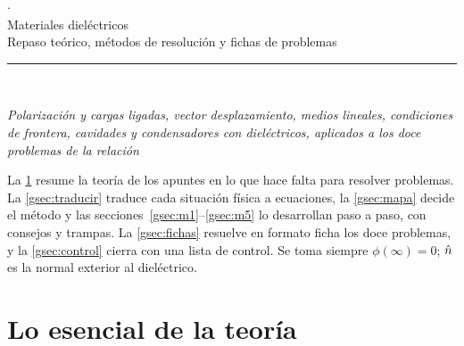 \thispagestyle{plain}
\newcommand{\ficha}[3]{\par\addvspace{1.1em}\noindent{\color{acentoA}\bfseries Problema #1.\ #2}\hfill
  {\small\sffamily\color{acentoC}#3}\par\nopagebreak\smallskip}

\begin{center}
  {\small\color{tenue}\quad$\cdot$\quad{}}\\[1.0em]
  {\fuentetitulo\fontsize{22}{26}\selectfont Materiales dieléctricos}\\[0.5em]
  {\large Repaso teórico, métodos de resolución y fichas de problemas}\\[0.8em]
  {\color{acentoA}\rule{2.6cm}{0.6pt}}\\[0.8em]
  \begin{minipage}{0.86\textwidth}\centering\small\itshape
  Polarización y cargas ligadas, vector desplazamiento, medios lineales, condiciones de frontera,
  cavidades y condensadores con dieléctricos, aplicados a los doce problemas de la relación
  \end{minipage}
\end{center}

\begin{consejo}
La \cref{gsec:teoria} resume la teoría de los apuntes en lo que hace falta para resolver problemas. La
\cref{gsec:traducir} traduce cada situación física a ecuaciones, la \cref{gsec:mapa} decide el método y las
secciones~\ref{gsec:m1}--\ref{gsec:m5} lo desarrollan paso a paso, con consejos y trampas. La
\cref{gsec:fichas} resuelve en formato ficha los doce problemas, y la \cref{gsec:control} cierra con una
lista de control. Se toma siempre $\phi(\infty)=0$; $\hat n$ es la normal exterior al dieléctrico.
\end{consejo}

{\small\tableofcontents}
\newpage

\section{Lo esencial de la teoría}\label{gsec:teoria}

